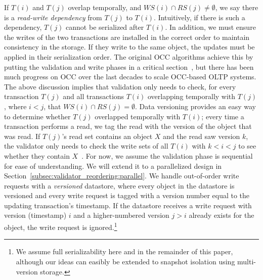 If $T(i)$ and $T(j)$ overlap temporally, and $WS(i) \cap RS(j) \neq \emptyset$, we say there is a \emph{read-write dependency} from $T(j)$ to $T(i)$. Intuitively, if there is such a dependency, $T(j)$ cannot be serialized after $T(i)$. In addition, we must ensure the writes of the two transactions are installed in the correct order to maintain consistency in the storage. If they write to the same object, the updates must be applied in their serialization order. The original OCC algorithms achieve this by putting the validation and write phases in a critical section~\cite{kung81tods}, but there has been much progress on OCC over the last decades to scale OCC-based OLTP systems. 
The above discussion implies that validation only needs to check, for every transaction $T(j)$ and all transactions $T(i)$ overlapping temporally with $T(j)$, where $i<j$, that $WS(i) \cap RS(j) = \emptyset$. Data versioning provides an easy way to determine whether $T(j)$ overlapped temporally with $T(i)$; every time a transaction performs a read, we tag the read with the version of the object that was read. If $T(j)$'s read set contains an object $X$ and the read saw version $k$, the validator only needs to check the write sets of all $T(i)$ with $k < i < j$ to see whether they contain $X$~\cite{ding2015centiman}.
For now, we assume the validation phase is sequential for ease of understanding. We will extend it to a parallelized design in Section~\ref{subsec:validator_reordering:parallel}. We handle out-of-order write requests with a \emph{versioned} datastore, where every object in the datastore is versioned and every write request is tagged with a version number equal to the updating transaction's timestamp. If the datastore receives a write request with version (timestamp) $i$ and a higher-numbered version $j > i$ already exists for the object, the write request is ignored.\footnote{We assume full serializability here and in the remainder of this paper, although our ideas can easibly be extended to snapshot isolation using multi-version storage.}

